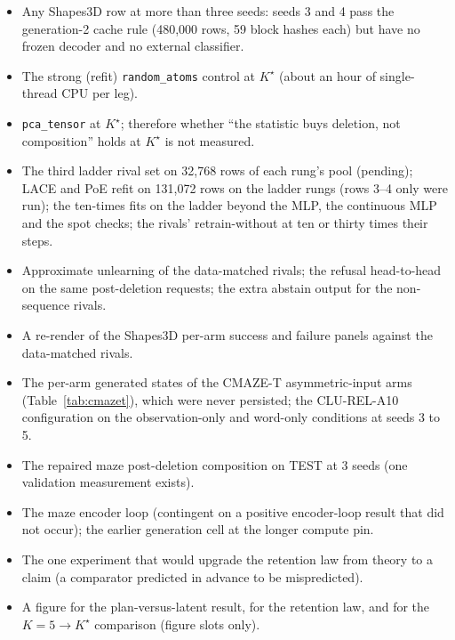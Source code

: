 \documentclass{article} %
\newcommand{\Kstar}{\ensuremath{K^{\star}}}
\begin{document}
\begin{itemize}[leftmargin=*,itemsep=1pt]
\item Any Shapes3D row at more than three seeds: seeds 3 and 4 pass the generation-2 cache rule
  (480,000 rows, 59 block hashes each) but have no frozen decoder and no external classifier.
\item The strong (refit) \texttt{random\_atoms} control at $\Kstar$ (about an hour of
  single-thread CPU per leg). %
\item \texttt{pca\_tensor} at $\Kstar$; therefore whether ``the statistic buys deletion, not
  composition'' holds at $\Kstar$ is not measured.
\item The third ladder rival set on 32,768 rows of each rung's pool (pending); LACE and PoE refit %
  on 131,072 rows on the ladder rungs (rows 3--4 only were run); the ten-times fits on the ladder %
  beyond the MLP, the continuous MLP and the spot checks; the rivals' retrain-without at ten or
  thirty times their steps.
\item Approximate unlearning of the data-matched rivals; the refusal head-to-head on the same
  post-deletion requests; the extra abstain output for the non-sequence rivals.
\item A re-render of the Shapes3D per-arm success and failure panels against the data-matched rivals.
\item The per-arm generated states of the CMAZE-T asymmetric-input arms (Table~\ref{tab:cmazet}),
  which were never persisted; the CLU-REL-A10 configuration on the observation-only and word-only
  conditions at seeds 3 to 5.
\item The repaired maze post-deletion composition on TEST at 3 seeds (one validation measurement
  exists).
\item The maze encoder loop (contingent on a positive encoder-loop result that did not occur); the
  earlier generation cell at the longer compute pin.
\item The one experiment that would upgrade the retention law from theory to a claim (a comparator
  predicted in advance to be mispredicted).
\item A figure for the plan-versus-latent result, for the retention law, and for the $K=5\to\Kstar$
  comparison (figure slots only).
\end{itemize}

\end{document}
